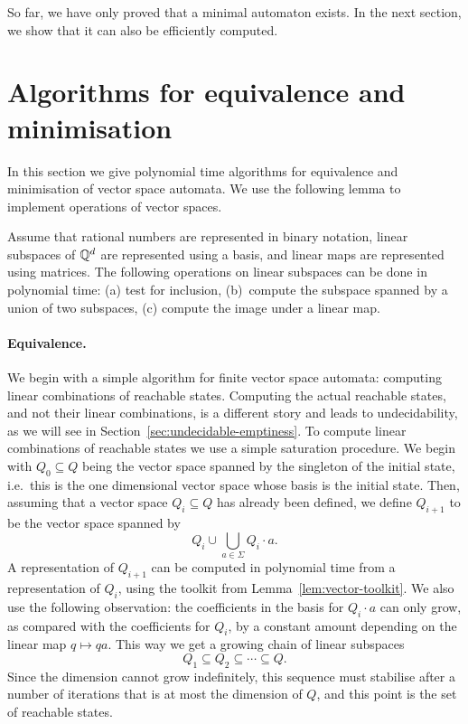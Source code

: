 So far, we have only proved that a minimal automaton exists. In the next section, we show that it can also be efficiently computed.

\section{Algorithms for equivalence and minimisation}
In this section we give polynomial time algorithms for equivalence and minimisation  of vector space automata. We use the following lemma to implement operations of vector spaces.

\begin{lemma}\label{lem:vector-toolkit}
  Assume that rational numbers are represented in binary notation,  linear subspaces of $\mathbb Q^d$ are represented using a basis, and linear maps are represented using matrices. The following operations on linear subspaces can be done in polynomial time: (a) test for inclusion, (b)~compute the subspace spanned by a union of two subspaces,  (c) compute the image under a linear map.
\end{lemma}
\paragraph*{Equivalence.}
We begin with a simple algorithm for finite vector space automata:  computing  linear combinations of reachable states. Computing the actual reachable states, and not their linear combinations, is a different story and leads to undecidability, as we will see in Section~\ref{sec:undecidable-emptiness}. To compute linear combinations of reachable states we use a simple saturation procedure. We begin with $Q_0 \subseteq Q$ being the vector space spanned by the singleton of the initial state, i.e.~this is the one dimensional vector space whose basis is  the initial state. Then, assuming that a vector space $Q_i \subseteq Q$ has already been defined, we define $Q_{i+1}$ to be the vector space spanned by $$Q_i \cup \bigcup_{a \in \Sigma}  Q_i \cdot a.$$
A representation of $Q_{i+1}$ can be computed in polynomial time from a representation of $Q_i$, using  the toolkit from Lemma~\ref{lem:vector-toolkit}. We also use the following observation: the coefficients in the basis for $Q_{i} \cdot a$ can only grow, as compared with the coefficients for $Q_i$, by a constant amount depending on the linear map $q \mapsto qa$. 
This way we get a growing chain of linear subspaces $$ Q_1 \subseteq Q_2 \subseteq \cdots \subseteq Q.$$
 Since the dimension cannot grow indefinitely, this sequence must stabilise  after a number of iterations that is at most the dimension of $Q$, and this point is the set of reachable states. 



